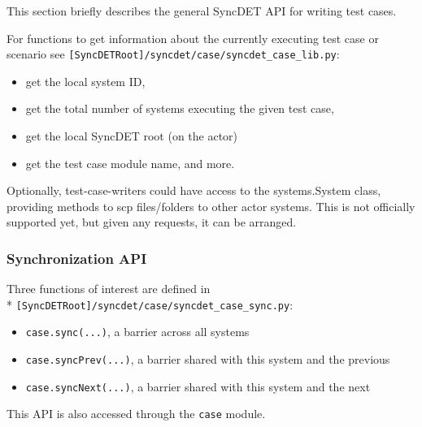 This section briefly describes the general SyncDET API for writing test cases.
 
For functions to get information about the currently executing test case or
scenario see {\tt [SyncDETRoot]/syncdet/case/syncdet\_case\_lib.py}:
\begin{itemize}
\item get the local system ID, 
\item get the total number of systems executing the given test case, 
\item get the local SyncDET root (on the actor)
\item get the test case module name, and more.
\end{itemize}

Optionally, test-case-writers could have access to the systems.System class,
providing methods to scp files/folders to other actor systems. This is not
officially supported yet, but given any requests, it can be arranged.

\subsubsection{Synchronization API}

Three functions of interest are defined in \\*
{\tt [SyncDETRoot]/syncdet/case/syncdet\_case\_sync.py}:
\begin{itemize}
\item {\tt case.sync(...)}, a barrier across all systems
\item {\tt case.syncPrev(...)}, a barrier shared with this system and the previous
\item {\tt case.syncNext(...)}, a barrier shared with this system and the next
\end{itemize}
This API is also accessed through the {\tt case} module.


